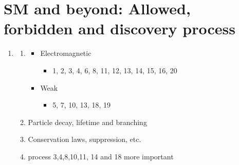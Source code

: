 \section{SM and beyond: Allowed, forbidden and discovery process}
\begin{enumerate}
  \item
    \begin{enumerate}
      \item
	\begin{itemize}
      	  \item Electromagnetic
      	    \begin{itemize}
      	      \item 1, 2, 3, 4, 6, 8, 11, 12, 13, 14, 15, 16, 20
      	    \end{itemize}
      	  \item Weak
      	    \begin{itemize}
      	      \item 5, 7, 10, 13, 18, 19
      	    \end{itemize}
      	\end{itemize}
      \item
	Particle decay, lifetime and branching
      \item
	Conservation laws, suppression, etc.
      \item
	process 3,4,8,10,11, 14 and 18 more important
    \end{enumerate}
\end{enumerate}
